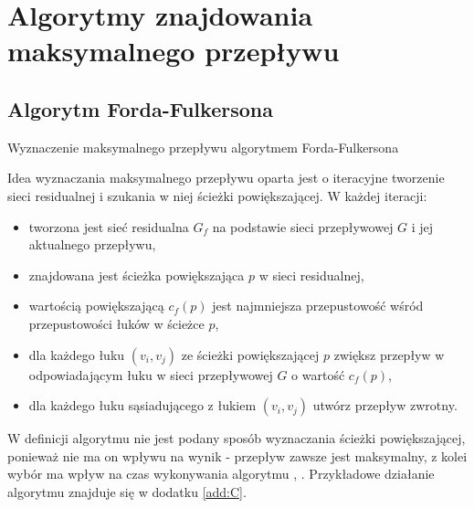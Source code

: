 \section{Algorytmy znajdowania maksymalnego przepływu}\label{sec:analizaAlgorytmy}
\subsection{Algorytm Forda-Fulkersona}\label{ssec:FordFulkersonAnaliza}
\begin{algorithm}[H]
	\caption{Wyznaczenie maksymalnego przepływu algorytmem Forda-Fulkersona}\label{fordFulkersonPseudo}
	\begin{algorithmic}
				\EndFor
			\EndWhile\space
		\EndProcedure
	\end{algorithmic}
\end{algorithm}\noindent
Idea wyznaczania maksymalnego przepływu oparta jest o iteracyjne tworzenie sieci residualnej i szukania w niej ścieżki powiększającej. W każdej iteracji:
\begin{itemize}
	\item tworzona jest sieć residualna $ G_f $ na podstawie sieci przepływowej $ G $ i jej aktualnego przepływu,
	\item znajdowana jest ścieżka powiększająca $ p $ w sieci residualnej,
	\item wartością powiększającą $ c_f(p) $ jest najmniejsza przepustowość wśród przepustowości łuków w ścieżce $ p $,
	\item dla każdego łuku $ (v_i,v_j) $ ze ścieżki powiększającej $ p $ zwiększ przepływ w odpowiadającym łuku w sieci przepływowej $ G $ o wartość $ c_f(p) $,
	\item dla każdego łuku sąsiadującego z łukiem $ (v_i,v_j) $ utwórz przepływ zwrotny. 
\end{itemize}
W definicji algorytmu nie jest podany sposób wyznaczania ścieżki powiększającej, ponieważ nie ma on wpływu na wynik - przepływ zawsze jest maksymalny, z kolei wybór ma wpływ na czas wykonywania algorytmu \cite{id:ZaawansowaneAlgorytmyFordFulkerson}, \cite{id:IntroductionToAlgorithmsFordFulkerson}. Przykładowe działanie algorytmu znajduje się w dodatku \ref{add:C}.
